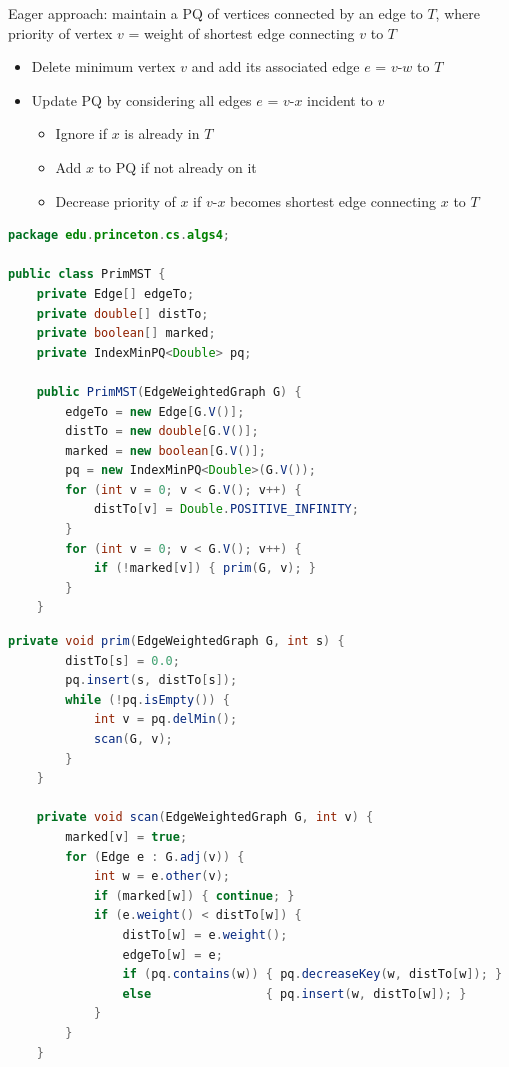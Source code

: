 \documentclass[8pt,a4paper,compress]{beamer}
\begin{document}
\begin{frame}[fragile]
Eager approach: maintain a PQ of vertices connected by an edge to $T$, where priority of vertex $v$ = weight of shortest edge connecting $v$ to $T$
\begin{itemize}
\item Delete minimum vertex $v$ and add its associated edge $e$ = $v$-$w$ to $T$ 

\item Update PQ by considering all edges $e$ = $v$-$x$ incident to $v$

\begin{itemize}
\item Ignore if $x$ is already in $T$

\item Add $x$ to PQ if not already on it

\item Decrease priority of $x$ if $v$-$x$ becomes shortest edge connecting $x$ to $T$
\end{itemize}
\end{itemize}

\begin{lstlisting}[language=Java]
package edu.princeton.cs.algs4;

public class PrimMST {
    private Edge[] edgeTo; 
    private double[] distTo; 
    private boolean[] marked; 
    private IndexMinPQ<Double> pq;

    public PrimMST(EdgeWeightedGraph G) {
        edgeTo = new Edge[G.V()];
        distTo = new double[G.V()];
        marked = new boolean[G.V()];
        pq = new IndexMinPQ<Double>(G.V());
        for (int v = 0; v < G.V(); v++) { 
            distTo[v] = Double.POSITIVE_INFINITY;
        }
        for (int v = 0; v < G.V(); v++) {
            if (!marked[v]) { prim(G, v); }
        }
    }
\end{lstlisting}
\end{frame}

\begin{frame}[fragile]
\begin{lstlisting}[language=Java]
    private void prim(EdgeWeightedGraph G, int s) {
        distTo[s] = 0.0;
        pq.insert(s, distTo[s]);
        while (!pq.isEmpty()) {
            int v = pq.delMin();
            scan(G, v);
        }
    }

    private void scan(EdgeWeightedGraph G, int v) {
        marked[v] = true;
        for (Edge e : G.adj(v)) {
            int w = e.other(v);
            if (marked[w]) { continue; }
            if (e.weight() < distTo[w]) {
                distTo[w] = e.weight();
                edgeTo[w] = e;
                if (pq.contains(w)) { pq.decreaseKey(w, distTo[w]); }
                else                { pq.insert(w, distTo[w]); }
            }
        }
    }
\end{lstlisting}
\end{frame}
\end{document}

